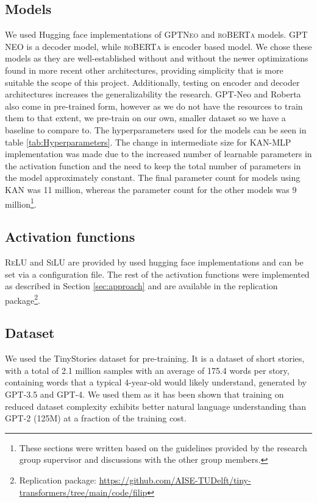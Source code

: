 \subsection{Models}
We used Hugging face implementations of \textsc{GPTNeo} \cite{huggingfaceNEO} and \textsc{roBERTa} \cite{huggingfaceRoberta} models. \textsc{GPT NEO} is a decoder model, while \textsc{roBERTa} is encoder based model. We chose these models as they are well-established without and without the newer optimizations found in more recent other architectures, providing simplicity that is more suitable the scope of this project. Additionally, testing on encoder and decoder architectures increases the generalizability the research. GPT-Neo and Roberta also come in pre-trained form, however as we do not have the resources to train them to that extent, we pre-train on our own, smaller dataset so we have a baseline to compare to. The hyperparameters used for the models can be seen in table \ref{tab:Hyperparameters}. The change in intermediate size for KAN-MLP implementation was made due to the increased number of learnable parameters in the activation function and the need to keep the total number of parameters in the model approximately constant. The final parameter count for models using KAN was 11 million, whereas the parameter count for the other models was 9 million\footnote{\label{footnote:text} These sections were written based on the guidelines provided by the research group supervisor and discussions with the other group members.}.

\subsection{Activation functions}
\textsc{ReLU} and \textsc{SiLU} are provided by used hugging face implementations and can be set via a configuration file. The rest of the activation functions were implemented as described in Section \ref{sec:approach} and are available in the replication package\footnote{Replication package: \url{https://github.com/AISE-TUDelft/tiny-transformers/tree/main/code/filip}}.

\subsection{Dataset}
We used the TinyStories \cite{Eldan2023} dataset for pre-training. It is a dataset of short stories, with a total of 2.1 million samples with an average of 175.4 words per story, containing words that a typical 4-year-old would likely understand, generated by GPT-3.5 and GPT-4. We used them as it has been shown that training on reduced dataset complexity exhibits better natural language understanding than GPT-2 (125M) at a fraction of the training cost\footnotemark[5].

